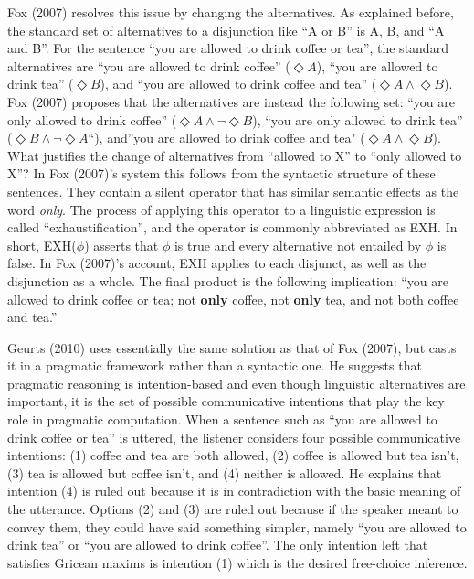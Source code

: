 \documentclass[oneside]{report}
\theoremstyle{definition}
\theoremstyle{definition}
\theoremstyle{definition}
\theoremstyle{remark}
\begin{document}
Fox (2007) resolves this issue by changing the alternatives. As
explained before, the standard set of alternatives to a disjunction like
``A or B'' is A, B, and ``A and B''. For the sentence ``you are allowed
to drink coffee or tea'', the standard alternatives are ``you are
allowed to drink coffee'' (\(\Diamond A\)), ``you are allowed to drink
tea'' (\(\Diamond B\)), and ``you are allowed to drink coffee and tea''
(\(\Diamond A \land \Diamond B\)). Fox (2007) proposes that the
alternatives are instead the following set: ``you are only allowed to
drink coffee'' (\(\Diamond A \land \lnot \Diamond B\)), ``you are only
allowed to drink tea'' (\(\Diamond B \land \lnot \Diamond A\)``),
and''you are allowed to drink coffee and tea"
(\(\Diamond A \land \Diamond B\)). What justifies the change of
alternatives from ``allowed to X'' to ``only allowed to X''? In Fox
(2007)'s system this follows from the syntactic structure of these
sentences. They contain a silent operator that has similar semantic
effects as the word \emph{only}. The process of applying this operator
to a linguistic expression is called ``exhaustification'', and the
operator is commonly abbreviated as EXH. In short, EXH(\(\phi\)) asserts
that \(\phi\) is true and every alternative not entailed by \(\phi\) is
false. In Fox (2007)'s account, EXH applies to each disjunct, as well as
the disjunction as a whole. The final product is the following
implication: ``you are allowed to drink coffee or tea; not \textbf{only}
coffee, not \textbf{only} tea, and not both coffee and tea.''

Geurts (2010) uses essentially the same solution as that of Fox (2007),
but casts it in a pragmatic framework rather than a syntactic one. He
suggests that pragmatic reasoning is intention-based and even though
linguistic alternatives are important, it is the set of possible
communicative intentions that play the key role in pragmatic
computation. When a sentence such as ``you are allowed to drink coffee
or tea'' is uttered, the listener considers four possible communicative
intentions: (1) coffee and tea are both allowed, (2) coffee is allowed
but tea isn't,(3) tea is allowed but coffee isn't, and (4) neither is
allowed. He explains that intention (4) is ruled out because it is in
contradiction with the basic meaning of the utterance. Options (2) and
(3) are ruled out because if the speaker meant to convey them, they
could have said something simpler, namely ``you are allowed to drink
tea'' or ``you are allowed to drink coffee''. The only intention left
that satisfies Gricean maxims is intention (1) which is the desired
free-choice inference.
\end{document}
